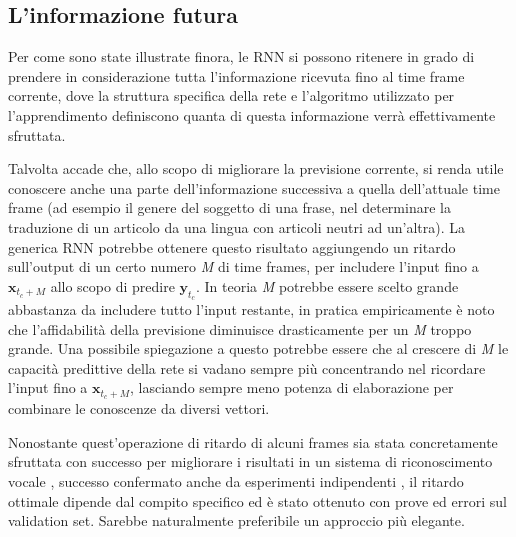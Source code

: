 \subsection{L'informazione futura} %
\label{sub:l_informazione_futura}
Per come sono state illustrate finora, le RNN si possono ritenere in grado di prendere in considerazione tutta l'informazione ricevuta fino al time frame corrente, dove la struttura specifica della rete e l'algoritmo utilizzato per l'apprendimento definiscono quanta di questa informazione verrà effettivamente sfruttata.

Talvolta accade che, allo scopo di migliorare la previsione corrente, si renda utile conoscere anche una parte dell'informazione successiva a quella dell'attuale time frame (ad esempio il genere del soggetto di una frase, nel determinare la traduzione di un articolo da una lingua con articoli neutri ad un'altra). La generica RNN potrebbe ottenere questo risultato aggiungendo un ritardo sull'output di un certo numero \textit{M} di time frames, per includere l'input fino a $\boldsymbol{x}_{t_c + M}$ allo scopo di predire $\boldsymbol{y}_{t_c}$. In teoria \textit{M} potrebbe essere scelto grande abbastanza da includere tutto l'input restante, in pratica empiricamente è noto che l'affidabilità della previsione diminuisce drasticamente per un \textit{M} troppo grande. Una possibile spiegazione a questo potrebbe essere che al crescere di \textit{M} le capacità predittive della rete si vadano sempre più concentrando nel ricordare l'input fino a $\boldsymbol{x}_{t_c + M}$, lasciando sempre meno potenza di elaborazione per combinare le conoscenze da diversi vettori.

Nonostante quest'operazione di ritardo di alcuni frames sia stata concretamente sfruttata con successo per migliorare i risultati in un sistema di riconoscimento vocale \cite{phone}, successo confermato anche da esperimenti indipendenti \cite{BRNN}, il ritardo ottimale dipende dal compito specifico ed è stato ottenuto con prove ed errori sul validation set. Sarebbe naturalmente preferibile un approccio più elegante.

